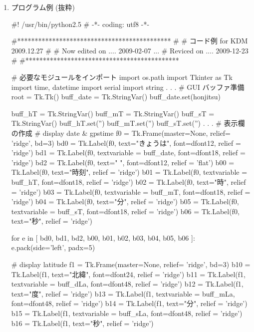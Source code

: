 \documentclass[mingoth,a4paper]{jsarticle}
\begin{document}
\begin{enumerate}
\begin{figure}[h!]
\end{figure}
\clearpage
\item プログラム例 (抜粋)
\begin{commandline}
#!	/usr/bin/python2.5 
# -*- coding: utf8 -*- 

#******************************************** 
#	 
#	コード例 for KDM 2009.12.27	 
#	 
#	Now edited on .... 2009-02-07 ... 
#	Reviced on    .... 2009-12-23 
#	 
#******************************************** 

# 必要なモジュールをインポート
import os.path 
import Tkinter as Tk 
import time, datetime 
import	serial 
import	string 
	. 
	. 
	. 
# GUI バッファ準備
root = Tk.Tk() 
buff_date = Tk.StringVar() 
buff_date.set(honjitsu) 

buff_hT = Tk.StringVar() 
buff_mT = Tk.StringVar() 
buff_sT = Tk.StringVar() 
buff_hT.set('') 
buff_mT.set('') 
buff_sT.set('') 
	. 
	. 
	. 
# 表示欄の作成
# display date &  gpstime 
f0 = Tk.Frame(master=None, relief= 'ridge', bd=3) 
bd0 = Tk.Label(f0, text="きょうは", font=dfont12, relief = 'ridge') 
bd1 = Tk.Label(f0, textvariable = buff_date, font=dfont18, relief = 'ridge') 
bd2 = Tk.Label(f0, text="    ", font=dfont12, relief = 'flat') 
b00 = Tk.Label(f0, text="時刻", relief = 'ridge') 
b01 = Tk.Label(f0, textvariable = buff_hT, font=dfont18, relief = 'ridge') 
b02 = Tk.Label(f0, text="時", relief = 'ridge') 
b03 = Tk.Label(f0, textvariable = buff_mT, font=dfont18, relief = 'ridge') 
b04 = Tk.Label(f0, text="分", relief = 'ridge') 
b05 = Tk.Label(f0, textvariable = buff_sT, font=dfont18, relief = 'ridge') 
b06 = Tk.Label(f0, text="秒", relief = 'ridge') 

for e in [ bd0, bd1, bd2, b00, b01, b02, b03, b04, b05, b06 ]: 
	e.pack(side='left', padx=5) 

# display latitude 
f1 = Tk.Frame(master=None, relief= 'ridge', bd=3) 
b10 = Tk.Label(f1, text="北緯", font=dfont24, relief = 'ridge') 
b11 = Tk.Label(f1, textvariable = buff_dLa, font=dfont48, relief = 'ridge') 
b12 = Tk.Label(f1, text="度", relief = 'ridge') 
b13 = Tk.Label(f1, textvariable = buff_mLa, font=dfont48, relief = 'ridge') 
b14 = Tk.Label(f1, text="分", relief = 'ridge') 
b15 = Tk.Label(f1, textvariable = buff_sLa, font=dfont48, relief = 'ridge') 
b16 = Tk.Label(f1, text="秒", relief = 'ridge') 


\end{commandline}
\end{enumerate}
\end{document}

